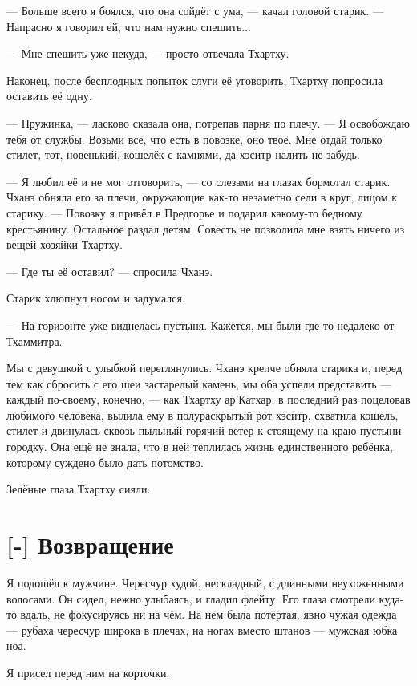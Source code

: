 --- Больше всего я боялся, что она сойдёт с ума, --- качал головой старик.
--- Напрасно я говорил ей, что нам нужно спешить...

--- Мне спешить уже некуда, --- просто отвечала Тхартху.

Наконец, после бесплодных попыток слуги её уговорить, Тхартху попросила оставить её одну.

--- Пружинка, --- ласково сказала она, потрепав парня по плечу.
--- Я освобождаю тебя от службы.
Возьми всё, что есть в повозке, оно твоё.
Мне отдай только стилет, тот, новенький, кошелёк с камнями, да хэситр налить не забудь.

--- Я любил её и не мог отговорить, --- со слезами на глазах бормотал старик.
Чханэ обняла его за плечи, окружающие как-то незаметно сели в круг, лицом к старику.
--- Повозку я привёл в Предгорье и подарил какому-то бедному крестьянину.
Остальное раздал детям.
Совесть не позволила мне взять ничего из вещей хозяйки Тхартху.

--- Где ты её оставил? --- спросила Чханэ.

Старик хлюпнул носом и задумался.

--- На горизонте уже виднелась пустыня.
Кажется, мы были где-то недалеко от Тхаммитра.

Мы с девушкой с улыбкой переглянулись.
Чханэ крепче обняла старика и, перед тем как сбросить с его шеи застарелый камень, мы оба успели представить --- каждый по-своему, конечно, --- как Тхартху ар’Катхар, в последний раз поцеловав любимого человека, вылила ему в полураскрытый рот хэситр, схватила кошель, стилет и двинулась сквозь пыльный горячий ветер к стоящему на краю пустыни городку.
Она ещё не знала, что в ней теплилась жизнь единственного ребёнка, которому суждено было дать потомство.

Зелёные глаза Тхартху сияли.

\section{[-] Возвращение}

\textspace

Я подошёл к мужчине.
Чересчур худой, нескладный, с длинными неухоженными волосами.
Он сидел, нежно улыбаясь, и гладил флейту.
Его глаза смотрели куда-то вдаль, не фокусируясь ни на чём.
На нём была потёртая, явно чужая одежда --- рубаха чересчур широка в плечах, на ногах вместо штанов --- мужская юбка ноа.

Я присел перед ним на корточки.

